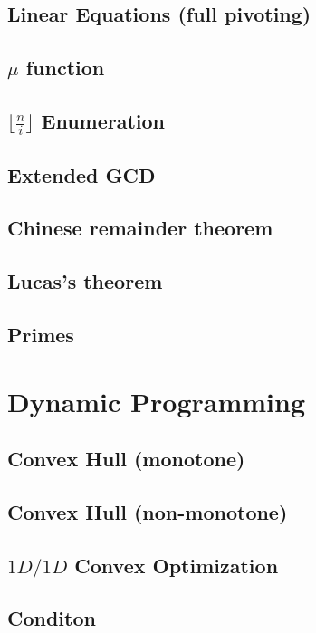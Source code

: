\documentclass[a4paper,10pt,twocolumn,oneside]{article}
\begin{document}
\subsection{Linear Equations (full pivoting)}

\subsection{$\mu$ function}

\subsection{$\lfloor \frac{n}{i} \rfloor$ Enumeration}

\subsection{Extended GCD}

\subsection{Chinese remainder theorem}

\subsection{Lucas's theorem}

\subsection{Primes}

\section{Dynamic Programming}
\subsection{Convex Hull (monotone)}

\subsection{Convex Hull (non-monotone)}

\subsection{$1D/1D$ Convex Optimization}

\subsection{Conditon}

\end{document}
